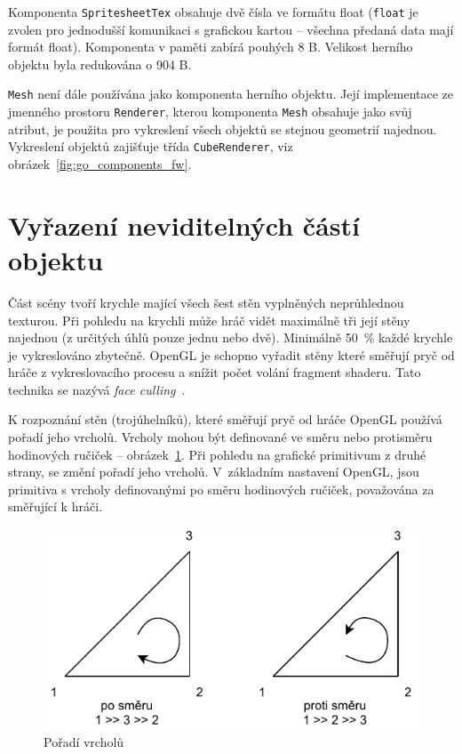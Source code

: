 \documentclass[thesis=M,czech]{FITthesis}[2019/12/23]
\begin{document}
Komponenta \texttt{SpritesheetTex} obsahuje dvě čísla ve formátu float (\texttt{float} je zvolen pro jednodušší komunikaci s grafickou kartou -- všechna předaná data mají formát float). Komponenta v paměti zabírá pouhých 8 B. Velikost herního objektu byla redukována o 904 B.

\texttt{Mesh} není dále používána jako komponenta herního objektu. Její implementace ze jmenného prostoru \texttt{Renderer}, kterou komponenta \texttt{Mesh} obsahuje jako svůj atribut, je použita pro vykreslení všech objektů se stejnou geometrií najednou. Vykreslení objektů zajišťuje třída \texttt{CubeRenderer}, viz obrázek~\ref{fig:go_components_fw}.

\section{Vyřazení neviditelných částí objektu}

Část scény tvoří krychle mající všech šest stěn vyplněných neprůhlednou texturou. Při pohledu na krychli může hráč vidět maximálně tři její stěny najednou (z určitých úhlů pouze jednu nebo dvě). Minimálně 50~\% každé krychle je vykreslováno zbytečně. OpenGL je schopno vyřadit stěny které směřují pryč od hráče z vykreslovacího procesu a snížit počet volání fragment shaderu. Tato technika se nazývá \textit{face culling}~\cite{lopgl_faceculling}.

K rozpoznání stěn (trojúhelníků), které směřují pryč od hráče OpenGL používá pořadí jeho vrcholů. Vrcholy mohou být definované ve směru nebo protisměru hodinových ručiček  -- obrázek~\ref{fig:winding_order}. Při pohledu na grafické primitivum z druhé strany, se změní pořadí jeho vrcholů. V~základním nastavení OpenGL, jsou primitiva s vrcholy definovanými po směru hodinových ručiček, považována za směřující k hráči.

\begin{figure}\centering
	\includegraphics[width=\textwidth]{images/winding_order}
	\caption[Pořadí vrcholů]{Pořadí vrcholů}\label{fig:winding_order}
\end{figure}
\end{document}
